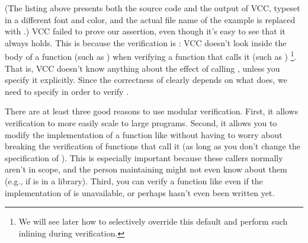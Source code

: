 
(The listing above presents both the source code and the output
of VCC, typeset in a different font and color, and 
the actual file name of the example is replaced with .)
VCC failed to prove our assertion, even though it's easy to see that
it always holds. This is because the verification is : VCC
doesn't look inside the body of a function (such as ) 
when verifying a function that calls it (such as )%
\footnote{We will see later how to selectively override this default
  and perform such inlining during verification.}.  
That is, VCC doesn't know anything about the effect of calling 
, unless you specify it explicitly.
Since the correctness of  clearly depends on what 
does, we need to specify  in order to verify .

\begin{note}
There are at least three good reasons to use modular
verification. First, it allows verification to more easily scale to
large programs. Second, it allows you to modify the implementation of
a function like  without having to worry about breaking the
verification of functions that call it (as long as you don't change
the specification of ). This is especially important
because these callers normally aren't in scope, and the person
maintaining  might not even know about them (e.g., if
 is in a library). Third, you can verify a function like
 even if the implementation of  is unavailable, or
perhaps hasn't even been written yet. 
\end{note}

